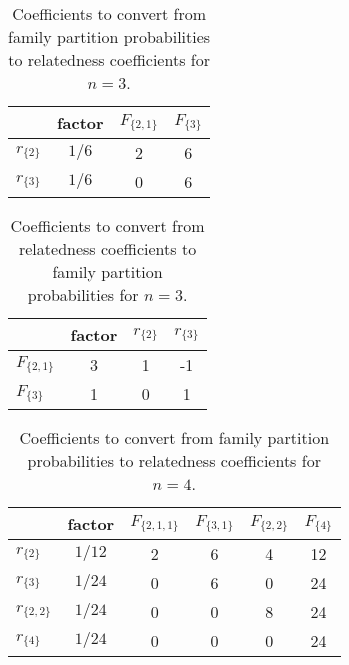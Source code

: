 \begin{table}[h]
\centering
\caption{Coefficients to convert from family partition probabilities to relatedness coefficients for $n=3$.}
\label{psi2rho3}
\begin{tabular}{lccc}
\toprule
            & factor &  $F_{\{2,1\}}$ &  $F_{\{3\}}$ \\
\midrule
$r_{\{2\}}$ &  $1/6$ &              2 &            6 \\
$r_{\{3\}}$ &  $1/6$ &              0 &            6 \\
\bottomrule
\end{tabular}
\end{table}

\begin{table}[h]
\centering
\caption{Coefficients to convert from relatedness coefficients to family partition probabilities for $n=3$.}
\label{rho2psi3}
\begin{tabular}{lccc}
\toprule
              &  factor &  $r_{\{2\}}$ &  $r_{\{3\}}$ \\
\midrule
$F_{\{2,1\}}$ &       3 &            1 &           -1 \\
  $F_{\{3\}}$ &       1 &            0 &            1 \\
\bottomrule
\end{tabular}
\end{table}

\begin{table}[h]
\centering
\caption{Coefficients to convert from family partition probabilities to relatedness coefficients for $n=4$.}
\label{psi2rho4}
\begin{tabular}{lccccc}
\toprule
              & factor &  $F_{\{2,1,1\}}$ &  $F_{\{3,1\}}$ &  $F_{\{2,2\}}$ &  $F_{\{4\}}$ \\
\midrule
  $r_{\{2\}}$ & $1/12$ &                2 &              6 &              4 &           12 \\
  $r_{\{3\}}$ & $1/24$ &                0 &              6 &              0 &           24 \\
$r_{\{2,2\}}$ & $1/24$ &                0 &              0 &              8 &           24 \\
  $r_{\{4\}}$ & $1/24$ &                0 &              0 &              0 &           24 \\
\bottomrule
\end{tabular}
\end{table}

